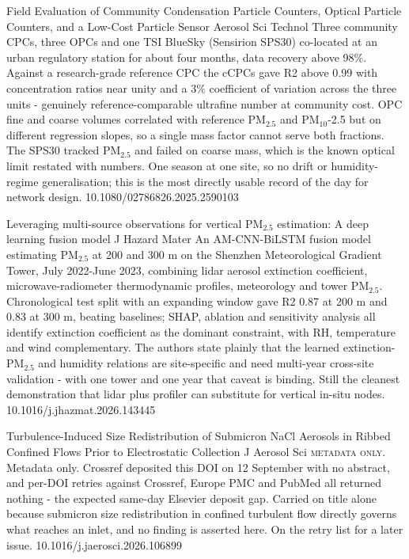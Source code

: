 \documentclass[10pt]{article}
\begin{document}
{Field Evaluation of Community Condensation Particle Counters, Optical Particle Counters, and a Low-Cost Particle Sensor}
{Aerosol Sci Technol}
{Three community CPCs, three OPCs and one TSI BlueSky (Sensirion SPS30) co-located at an urban regulatory station for about four months, data recovery above 98\%. Against a research-grade reference CPC the cCPCs gave R2 above 0.99 with concentration ratios near unity and a 3\% coefficient of variation across the three units - genuinely reference-comparable ultrafine number at community cost. OPC fine and coarse volumes correlated with reference PM$_{2.5}$ and PM$_{10}$-2.5 but on different regression slopes, so a single mass factor cannot serve both fractions. The SPS30 tracked PM$_{2.5}$ and failed on coarse mass, which is the known optical limit restated with numbers. One season at one site, so no drift or humidity-regime generalisation; this is the most directly usable record of the day for network design.}
{10.1080/02786826.2025.2590103}

{Leveraging multi-source observations for vertical PM$_{2.5}$ estimation: A deep learning fusion model}
{J Hazard Mater}
{An AM-CNN-BiLSTM fusion model estimating PM$_{2.5}$ at 200 and 300 m on the Shenzhen Meteorological Gradient Tower, July 2022-June 2023, combining lidar aerosol extinction coefficient, microwave-radiometer thermodynamic profiles, meteorology and tower PM$_{2.5}$. Chronological test split with an expanding window gave R2 0.87 at 200 m and 0.83 at 300 m, beating baselines; SHAP, ablation and sensitivity analysis all identify extinction coefficient as the dominant constraint, with RH, temperature and wind complementary. The authors state plainly that the learned extinction-PM$_{2.5}$ and humidity relations are site-specific and need multi-year cross-site validation - with one tower and one year that caveat is binding. Still the cleanest demonstration that lidar plus profiler can substitute for vertical in-situ nodes.}
{10.1016/j.jhazmat.2026.143445}

{Turbulence-Induced Size Redistribution of Submicron NaCl Aerosols in Ribbed Confined Flows Prior to Electrostatic Collection}
{J Aerosol Sci}
{\textsc{metadata only.} Metadata only. Crossref deposited this DOI on 12 September with no abstract, and per-DOI retries against Crossref, Europe PMC and PubMed all returned nothing - the expected same-day Elsevier deposit gap. Carried on title alone because submicron size redistribution in confined turbulent flow directly governs what reaches an inlet, and no finding is asserted here. On the retry list for a later issue.}
{10.1016/j.jaerosci.2026.106899}
\end{document}
